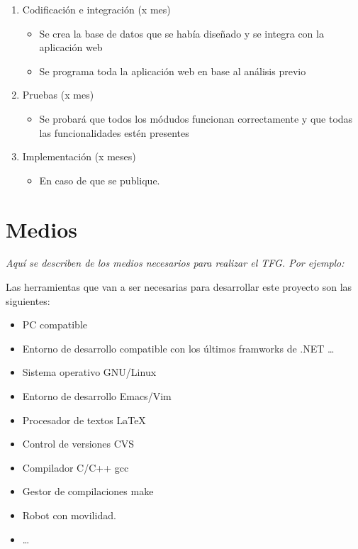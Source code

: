 \begin{enumerate}
\item Codificaci\'on e integraci\'on (x mes)
  \begin{itemize}
  \item Se crea la base de datos que se había diseñado y se integra con la aplicación web
  \item Se programa toda la aplicación web en base al análisis previo
  \end{itemize}

\item Pruebas (x mes)
  \begin{itemize}
  \item Se probará que todos los módudos funcionan correctamente y que todas las funcionalidades estén presentes
  \end{itemize}

\item Implementaci\'on  (x meses)
  \begin{itemize}
  \item En caso de que se publique.
  \end{itemize}

\end{enumerate}


\section{Medios}
\label{sec:medios}

\textit{Aquí se describen de los medios necesarios para realizar el TFG. Por
  ejemplo:}

Las herramientas que van a ser necesarias para desarrollar este proyecto
son las siguientes:

\begin{itemize}
\item PC compatible
\item Entorno de desarrollo compatible con los últimos framworks de .NET  \ldots
\item Sistema operativo GNU/Linux~\cite{gnulinux}
\item Entorno de desarrollo Emacs/Vim~\cite{emacs}
\item Procesador de textos \LaTeX~\cite{lamport94}
\item Control de versiones CVS~\cite{cvs}
\item Compilador C/C++ gcc~\cite{gcc}
\item Gestor de compilaciones make~\cite{make}
\item Robot con movilidad.
\item  \ldots
\end{itemize}



